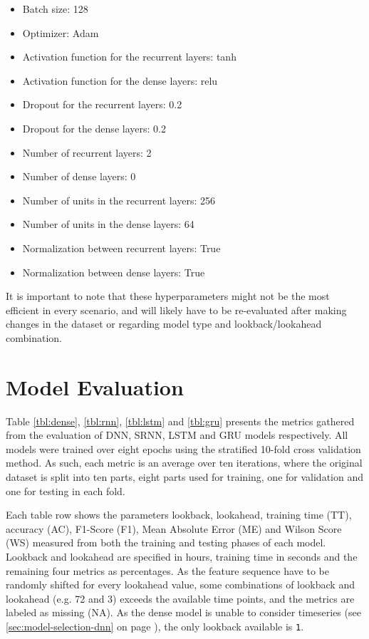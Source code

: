 \begin{itemize}
	\item Batch size: 128
	\item Optimizer: Adam
	\item Activation function for the recurrent layers: tanh
	\item Activation function for the dense layers: relu
	\item Dropout for the recurrent layers: 0.2
	\item Dropout for the dense layers: 0.2
	\item Number of recurrent layers: 2
	\item Number of dense layers: 0
	\item Number of units in the recurrent layers: 256
	\item Number of units in the dense layers: 64
	\item Normalization between recurrent layers: True
	\item Normalization between dense layers: True
\end{itemize}

It is important to note that these hyperparameters might not be the most efficient in every scenario, and will likely have to be re-evaluated after making changes in the dataset or regarding model type and lookback/lookahead combination.

\section{Model Evaluation}

Table \ref{tbl:dense}, \ref{tbl:rnn}, \ref{tbl:lstm} and \ref{tbl:gru} presents the metrics gathered from the evaluation of DNN, SRNN, LSTM and GRU models respectively. All models were trained over eight epochs using the stratified 10-fold cross validation method. As such, each metric is an average over ten iterations, where the original dataset is split into ten parts, eight parts used for training, one for validation and one for testing in each fold.

Each table row shows the parameters lookback, lookahead, training time (TT), accuracy (AC), F1-Score (F1), Mean Absolute Error (ME) and Wilson Score (WS) measured from both the training and testing phases of each model. Lookback and lookahead are specified in hours, training time in seconds and the remaining four metrics as percentages. As the feature sequence have to be randomly shifted for every lookahead value, some combinations of lookback and lookahead (e.g. 72 and 3) exceeds the available time points, and the metrics are labeled as missing (NA). As the dense model is unable to consider timeseries (see \ref{sec:model-selection-dnn} on page \pageref{sec:model-selection-dnn}), the only lookback available is \texttt{1}.

